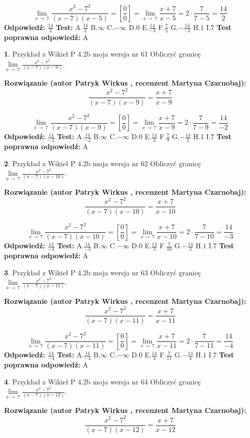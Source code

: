 \documentclass[12pt, a4paper]{article}
\theoremstyle{definition} %
\newtheorem{zad}{}
\newcommand{\zadStart}[1]{\begin{zad}#1\newline}
\newcommand{\zadStop}{\end{zad}}
\newcommand{\rozwStart}[2]{\noindent \textbf{Rozwiązanie (autor #1 , recenzent #2): }\newline}
\newcommand{\rozwStop}{\newline}
\newcommand{\odpStart}{\noindent \textbf{Odpowiedź:}\newline}
\newcommand{\odpStop}{\newline}
\newcommand{\testStart}{\noindent \textbf{Test:}\newline}
\newcommand{\testStop}{\newline}
\newcommand{\kluczStart}{\noindent \textbf{Test poprawna odpowiedź:}\newline}
\newcommand{\kluczStop}{\newline}
\begin{document}
$$\lim\limits_{x\to\ 7}\frac{x^{2}-7^{2}}{(x-7)(x-5)}=[\frac{0}{0}]=\lim\limits_{x\to\ 7}\frac{x+7}{x-5}=2 \cdot \frac{7}{7-5} = \frac{14}{2}$$
\rozwStop
\odpStart
$\frac{14}{2}$
\odpStop
\testStart
A.$\frac{14}{2}$
B.$\infty$
C.$-\infty$
D.$0$
E.$\frac{14}{-2}$
F.$\frac{7}{5}$
G.$-\frac{14}{-2}$
H.$1$
I.$7$
\testStop
\kluczStart
A
\kluczStop



\zadStart{Przykład z Wikieł P 4.2b moja wersja nr 61}
Obliczyć granicę $\lim\limits_{x\to\ 7}\frac{x^{2}-7^{2}}{(x-7)(x-9)}$.
\zadStop
\rozwStart{Patryk Wirkus}{Martyna Czarnobaj}
$$\frac{x^{2}-7^{2}}{(x-7)(x-9)}=\frac{x+7}{x-9}$$

$$\lim\limits_{x\to\ 7}\frac{x^{2}-7^{2}}{(x-7)(x-9)}=[\frac{0}{0}]=\lim\limits_{x\to\ 7}\frac{x+7}{x-9}=2 \cdot \frac{7}{7-9} = \frac{14}{-2}$$
\rozwStop
\odpStart
$\frac{14}{-2}$
\odpStop
\testStart
A.$\frac{14}{-2}$
B.$\infty$
C.$-\infty$
D.$0$
E.$\frac{14}{2}$
F.$\frac{7}{9}$
G.$-\frac{14}{2}$
H.$1$
I.$7$
\testStop
\kluczStart
A
\kluczStop



\zadStart{Przykład z Wikieł P 4.2b moja wersja nr 62}
Obliczyć granicę $\lim\limits_{x\to\ 7}\frac{x^{2}-7^{2}}{(x-7)(x-10)}$.
\zadStop
\rozwStart{Patryk Wirkus}{Martyna Czarnobaj}
$$\frac{x^{2}-7^{2}}{(x-7)(x-10)}=\frac{x+7}{x-10}$$

$$\lim\limits_{x\to\ 7}\frac{x^{2}-7^{2}}{(x-7)(x-10)}=[\frac{0}{0}]=\lim\limits_{x\to\ 7}\frac{x+7}{x-10}=2 \cdot \frac{7}{7-10} = \frac{14}{-3}$$
\rozwStop
\odpStart
$\frac{14}{-3}$
\odpStop
\testStart
A.$\frac{14}{-3}$
B.$\infty$
C.$-\infty$
D.$0$
E.$\frac{14}{3}$
F.$\frac{7}{10}$
G.$-\frac{14}{3}$
H.$1$
I.$7$
\testStop
\kluczStart
A
\kluczStop



\zadStart{Przykład z Wikieł P 4.2b moja wersja nr 63}
Obliczyć granicę $\lim\limits_{x\to\ 7}\frac{x^{2}-7^{2}}{(x-7)(x-11)}$.
\zadStop
\rozwStart{Patryk Wirkus}{Martyna Czarnobaj}
$$\frac{x^{2}-7^{2}}{(x-7)(x-11)}=\frac{x+7}{x-11}$$

$$\lim\limits_{x\to\ 7}\frac{x^{2}-7^{2}}{(x-7)(x-11)}=[\frac{0}{0}]=\lim\limits_{x\to\ 7}\frac{x+7}{x-11}=2 \cdot \frac{7}{7-11} = \frac{14}{-4}$$
\rozwStop
\odpStart
$\frac{14}{-4}$
\odpStop
\testStart
A.$\frac{14}{-4}$
B.$\infty$
C.$-\infty$
D.$0$
E.$\frac{14}{4}$
F.$\frac{7}{11}$
G.$-\frac{14}{4}$
H.$1$
I.$7$
\testStop
\kluczStart
A
\kluczStop



\zadStart{Przykład z Wikieł P 4.2b moja wersja nr 64}
Obliczyć granicę $\lim\limits_{x\to\ 7}\frac{x^{2}-7^{2}}{(x-7)(x-12)}$.
\zadStop
\rozwStart{Patryk Wirkus}{Martyna Czarnobaj}
$$\frac{x^{2}-7^{2}}{(x-7)(x-12)}=\frac{x+7}{x-12}$$
\end{document}
